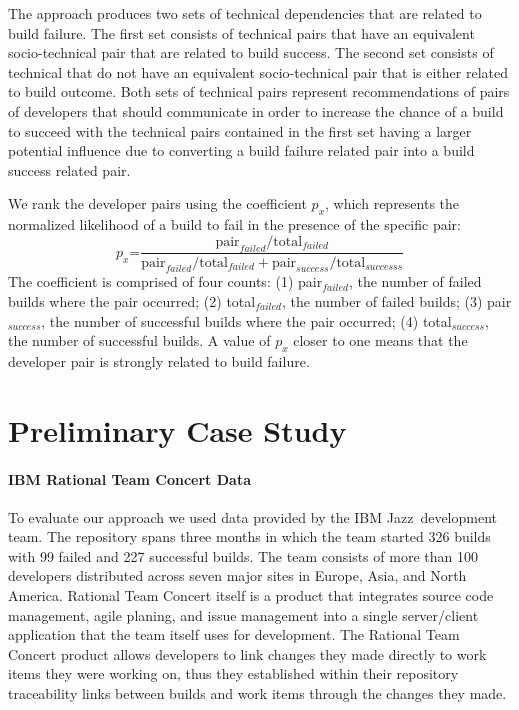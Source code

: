 \documentclass[conference]{IEEEtran}
\begin{document}
The approach produces two sets of technical dependencies that are related to build failure.
The first set consists of technical pairs that have an equivalent socio-technical pair that are related to build success.
The second set consists of technical that do not have an equivalent socio-technical pair that is either related to build outcome.
Both sets of technical pairs represent recommendations of pairs of developers that should communicate in order to increase the chance of a build to succeed with the technical pairs contained in the first set having a larger potential influence due to converting a build failure related pair into a build success related pair.

We rank the developer pairs using the coefficient $p_x$,
which represents the normalized likelihood of a build
to fail in the presence of the specific pair:
$$
p_x\text{=}\frac{ \text{pair}_{failed} / \text{total}_{failed} }
                     { \text{pair}_{failed} / \text{total}_{failed} + \text{pair}_{success} / \text{total}_{successs}}
$$
The coefficient is comprised of four counts: (1) pair$_{failed}$, the number of failed builds where the pair occurred; (2) total$_{failed}$, the number of failed builds; (3) pair$_{success}$, the number of successful builds where the pair occurred; (4) total$_{success}$, the number of successful builds.
A value of $p_x$ closer to one means that the developer pair is strongly related to build
failure. 

\section{Preliminary Case Study}
\setcounter{paragraph}{0}
\paragraph{IBM Rational Team Concert Data}
To evaluate our approach we used data provided by the IBM Jazz\texttrademark\ development team.
The repository spans three months in which the team started 326 builds with 99 failed and 227 successful builds.
The team consists of more than 100 developers distributed across seven major sites in Europe, Asia, and North America.
Rational Team Concert itself is a product that integrates source code management, agile planing, and issue management into a single server/client application that the team itself uses for development.
The Rational Team Concert product allows developers to link changes they made directly to work items they were working on, thus they established within their repository traceability links between builds and work items through the changes they made.
\end{document}
